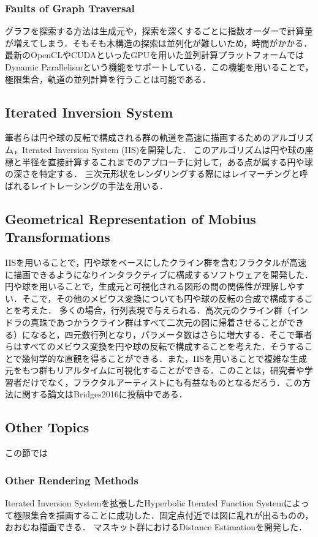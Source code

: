 \subsubsection{Faults of Graph Traversal}
グラフを探索する方法は生成元や，探索を深くするごとに指数オーダーで計算量が増えてしまう．そもそも木構造の探索は並列化が難しいため，時間がかかる．
最新のOpenCLやCUDAといったGPUを用いた並列計算プラットフォームではDynamic Parallelismという機能をサポートしている．この機能を用いることで，極限集合，軌道の並列計算を行うことは可能である．

\subsection{Iterated Inversion System}
筆者らは円や球の反転で構成される群の軌道を高速に描画するためのアルゴリズム，Iterated Inversion System (IIS)を開発した．
このアルゴリズムは円や球の座標と半径を直接計算するこれまでのアプローチに対して，ある点が属する円や球の深さを特定する．
三次元形状をレンダリングする際にはレイマーチングと呼ばれるレイトレーシングの手法を用いる．

\subsection{Geometrical Representation of Mobius Transformations}
IISを用いることで，円や球をベースにしたクライン群を含むフラクタルが高速に描画できるようになりインタラクティブに構成するソフトウェアを開発した．
円や球を用いることで，生成元と可視化される図形の間の関係性が理解しやすい．そこで，その他のメビウス変換についても円や球の反転の合成で構成することを考えた．
多くの場合，行列表現で与えられる．高次元のクライン群（インドラの真珠であつかうクライン群はすべて二次元の図に帰着させることができる）になると，四元数行列となり，パラメータ数はさらに増大する．そこで筆者らはすべてのメビウス変換を円や球の反転で構成することを考えた．そうすることで幾何学的な直観を得ることができる．また，IISを用いることで複雑な生成元をもつ群もリアルタイムに可視化することができる．このことは，研究者や学習者だけでなく，フラクタルアーティストにも有益なものとなるだろう．この方法に関する論文はBridges2016に投稿中である．

\subsection{Other Topics}
この節では

\subsubsection{Other Rendering Methods}
Iterated Inversion Systemを拡張したHyperbolic Iterated Function Systemによって極限集合を描画することに成功した．固定点付近では図に乱れが出るものの，おおむね描画できる．
マスキット群におけるDistance Estimationを開発した．

